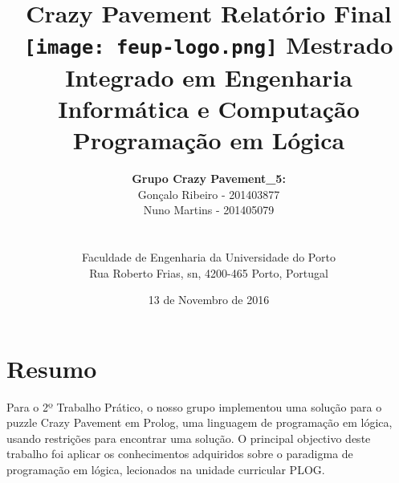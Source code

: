\documentclass[a4paper]{article}
\begin{document}
\setlength{\textwidth}{16cm}
\setlength{\textheight}{22cm}

\title{\Huge\textbf{Crazy Pavement}\linebreak\linebreak\linebreak
\Large\textbf{Relatório Final}\linebreak\linebreak
\linebreak\linebreak
\texttt{[image: feup-logo.png]}\linebreak\linebreak
\linebreak\linebreak
\Large{Mestrado Integrado em Engenharia Informática e Computação} \linebreak\linebreak
\Large{Programação em Lógica}\linebreak
}

\author{\textbf{Grupo Crazy Pavement\_5:}\\ Gonçalo Ribeiro - 201403877 \\ Nuno Martins - 201405079 \\\linebreak\linebreak \\
 \\ Faculdade de Engenharia da Universidade do Porto \\ Rua Roberto Frias, s\/n, 4200-465 Porto, Portugal \linebreak\linebreak\linebreak
\linebreak\linebreak\vspace{1cm}}
\date{13 de Novembro de 2016}
\maketitle
\thispagestyle{empty}


\newpage

\section*{Resumo}
Para o 2º Trabalho Prático, o nosso grupo implementou uma solução para o puzzle Crazy Pavement em Prolog, uma linguagem de programação em lógica, usando restrições para encontrar uma solução.
O principal objectivo deste trabalho foi aplicar os conhecimentos adquiridos sobre o paradigma de programação em lógica, lecionados na unidade curricular PLOG.
\end{document}
